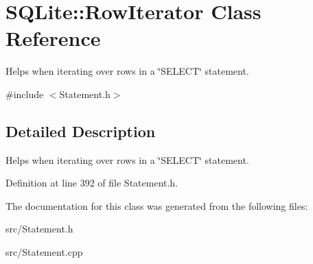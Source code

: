 \hypertarget{a00007}{\section{S\-Q\-Lite\-:\-:Row\-Iterator Class Reference}
\label{a00007}
}


Helps when iterating over rows in a \char`\"{}\-S\-E\-L\-E\-C\-T\char`\"{} statement.  




{\ttfamily \#include $<$Statement.\-h$>$}



\subsection{Detailed Description}
Helps when iterating over rows in a \char`\"{}\-S\-E\-L\-E\-C\-T\char`\"{} statement. 

Definition at line 392 of file Statement.\-h.



The documentation for this class was generated from the following files\-:\begin{DoxyCompactItemize}
\item 
src/Statement.\-h\item 
src/Statement.\-cpp\end{DoxyCompactItemize}

